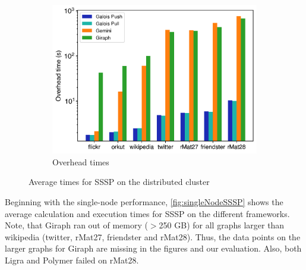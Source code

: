\begin{figure}[h]
\begin{subfigure}{0.32\textwidth}
		\includegraphics[width=\linewidth]{../../plots/distributedSSSP_overheadTime.png}
		\caption{Overhead times}
		\label{fig:distributedSSSP_overhead}
	\end{subfigure}
	\caption{Average times for SSSP on the distributed cluster}
	\label{fig:distributedSSSP}
\end{figure}
Beginning with the single-node performance, \autoref{fig:singleNodeSSSP} shows the average calculation and execution times for SSSP on the different frameworks.
Note, that Giraph ran out of memory ($>$250 GB) for all graphs larger than wikipedia (twitter, rMat27, friendster and rMat28). Thus, the data points on the larger graphs for Giraph are missing in the figures and our evaluation. 
Also, both Ligra and Polymer failed on rMat28.


